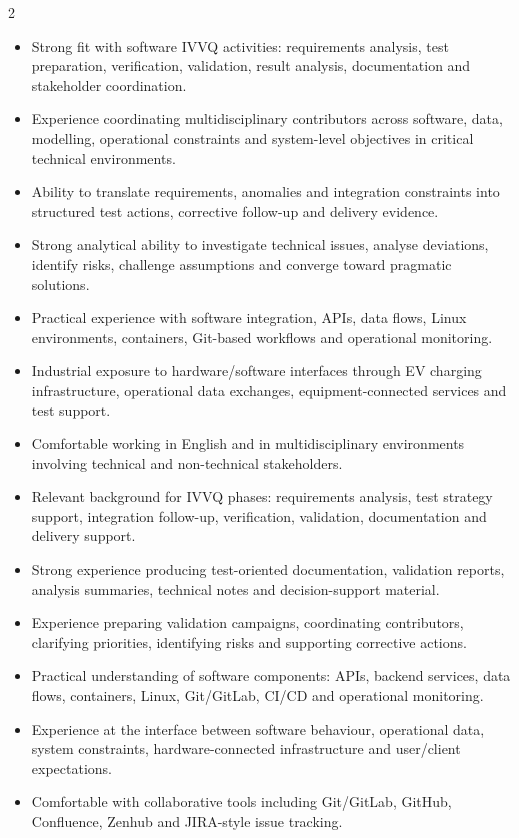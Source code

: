 \documentclass[8pt,a4paper,ragged2e,withhyper]{altacv}
\begin{document}
\begin{paracol}{2}
\begin{itemize}
  \item Strong fit with software IVVQ activities: requirements analysis, test preparation, verification, validation, result analysis, documentation and stakeholder coordination.
  \item Experience coordinating multidisciplinary contributors across software, data, modelling, operational constraints and system-level objectives in critical technical environments.
  \item Ability to translate requirements, anomalies and integration constraints into structured test actions, corrective follow-up and delivery evidence.
  \item Strong analytical ability to investigate technical issues, analyse deviations, identify risks, challenge assumptions and converge toward pragmatic solutions.
  \item Practical experience with software integration, APIs, data flows, Linux environments, containers, Git-based workflows and operational monitoring.
  \item Industrial exposure to hardware/software interfaces through EV charging infrastructure, operational data exchanges, equipment-connected services and test support.
  \item Comfortable working in English and in multidisciplinary environments involving technical and non-technical stakeholders.
\end{itemize}


\begin{itemize}
  \item Relevant background for IVVQ phases: requirements analysis, test strategy support, integration follow-up, verification, validation, documentation and delivery support.
  \item Strong experience producing test-oriented documentation, validation reports, analysis summaries, technical notes and decision-support material.
  \item Experience preparing validation campaigns, coordinating contributors, clarifying priorities, identifying risks and supporting corrective actions.
  \item Practical understanding of software components: APIs, backend services, data flows, containers, Linux, Git/GitLab, CI/CD and operational monitoring.
  \item Experience at the interface between software behaviour, operational data, system constraints, hardware-connected infrastructure and user/client expectations.
  \item Comfortable with collaborative tools including Git/GitLab, GitHub, Confluence, Zenhub and JIRA-style issue tracking.
\end{itemize}


\end{paracol}
\end{document}
